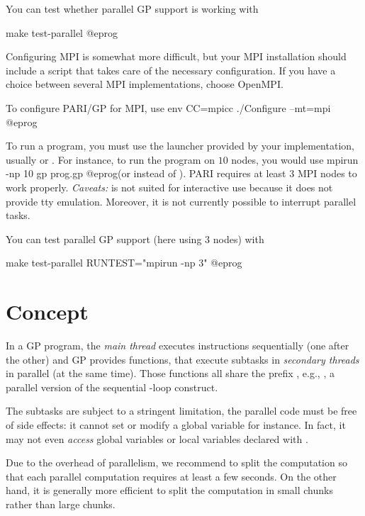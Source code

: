 You can test whether parallel GP support is working with

\bprog
make test-parallel
@eprog


Configuring MPI is somewhat more difficult, but your MPI installation should
include a script  that takes care of the necessary configuration.
If you have a choice between several MPI implementations, choose OpenMPI.

To configure PARI/GP for MPI, use
\bprog
env CC=mpicc ./Configure --mt=mpi
@eprog

To run a program, you must use the launcher provided by your implementation,
usually  or . For instance, to run
the program  on $10$ nodes, you would use
\bprog
  mpirun -np 10 gp prog.gp
@eprog\noindent (or  instead of ). PARI
requires at least $3$ MPI nodes to work properly. \emph{Caveats:}
 is not suited for interactive use because it does not provide
tty emulation. Moreover, it is not currently possible to interrupt parallel
tasks.

You can test parallel GP support (here using 3 nodes) with

\bprog
make test-parallel RUNTEST="mpirun -np 3"
@eprog

\section{Concept}

In a GP program, the \emph{main thread} executes instructions sequentially
(one after the other) and GP provides functions, that execute subtasks in
\emph{secondary threads} in parallel (at the same time). Those functions all
share the prefix , e.g., , a parallel version of the
sequential -loop construct.

The subtasks are subject to a stringent limitation, the parallel code
must be free of side effects: it cannot set or modify a global variable
for instance. In fact, it may not even \emph{access} global variables or
local variables declared with .

Due to the overhead of parallelism, we recommend to split the computation so
that each parallel computation requires at least a few seconds. On the other
hand, it is generally more efficient to split the computation in small chunks
rather than large chunks.


